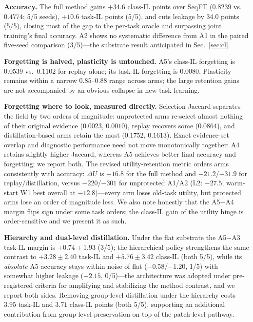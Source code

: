 \documentclass[11pt]{article}
\begin{document}
\textbf{Accuracy.} The full method gains $+34.6$ class-IL points over SeqFT ($0.8239$ vs.\ $0.4774$; 5/5 seeds), $+10.6$ task-IL points (5/5), and cuts leakage by $34.0$ points (5/5), closing most of the gap to the per-task oracle and surpassing joint training's final accuracy. A2 shows no systematic difference from A1 in the paired five-seed comparison (3/5)---the substrate result anticipated in Sec.~\ref{sec:cl}.

\textbf{Forgetting is halved, plasticity is untouched.} A5's class-IL forgetting is $0.0539$ vs.\ $0.1102$ for replay alone; its task-IL forgetting is $0.0080$. Plasticity remains within a narrow $0.85$--$0.88$ range across arms; the large retention gains are not accompanied by an obvious collapse in new-task learning.

\textbf{Forgetting where to look, measured directly.} Selection Jaccard separates the field by two orders of magnitude: unprotected arms re-select almost nothing of their original evidence ($0.0023$, $0.0010$), replay recovers some ($0.0864$), and distillation-based arms retain the most ($0.1752$, $0.1613$). Exact evidence-set overlap and diagnostic performance need not move monotonically together: A4 retains slightly higher Jaccard, whereas A5 achieves better final accuracy and forgetting; we report both. The revised utility-retention metric orders arms consistently with accuracy: $\Delta U$ is $-16.8$ for the full method and $-21.2$/$-31.9$ for replay/distillation, versus $-220$/$-301$ for unprotected A1/A2 (L2: $-27.5$; warm-start W1 best overall at $-12.8$)---every arm loses old-task utility, but protected arms lose an order of magnitude less. We also note honestly that the A5$-$A4 margin flips sign under some task orders; the class-IL gain of the utility hinge is order-sensitive and we present it as such.

\textbf{Hierarchy and dual-level distillation.} Under the flat substrate the A5$-$A3 task-IL margin is $+0.74{\pm}1.93$ (3/5); the hierarchical policy strengthens the same contrast to $+3.28{\pm}2.40$ task-IL and $+5.76{\pm}3.42$ class-IL (both 5/5), while its \emph{absolute} A5 accuracy stays within noise of flat ($-0.58$/$-1.20$, 1/5) with somewhat higher leakage ($+2.15$, 0/5)---the architecture was adopted under pre-registered criteria for amplifying and stabilizing the method contrast, and we report both sides. Removing group-level distillation under the hierarchy costs $3.95$ task-IL and $3.71$ class-IL points (both 5/5), supporting an additional contribution from group-level preservation on top of the patch-level pathway.
\end{document}
